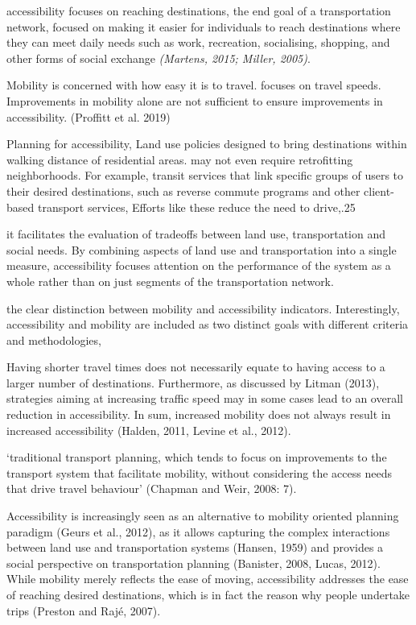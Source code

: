 \documentclass[12pt,]{article}
\begin{document}
accessibility focuses on reaching destinations, the end goal of a
transportation network, focused on making it easier for individuals to
reach destinations where they can meet daily needs such as work,
recreation, socialising, shopping, and other forms of social exchange
\emph{(Martens, 2015; Miller, 2005)}.

Mobility is concerned with how easy it is to travel. focuses on travel
speeds. Improvements in mobility alone are not sufficient to ensure
improvements in accessibility. (Proffitt et al. 2019)

Planning for accessibility, Land use policies designed to bring
destinations within walking distance of residential areas. may not even
require retrofitting neighborhoods. For example, transit services that
link specific groups of users to their desired destinations, such as
reverse commute programs and other client-based transport services,
Efforts like these reduce the need to drive,.25

it facilitates the evaluation of tradeoffs between land use,
transportation and social needs. By combining aspects of land use and
transportation into a single measure, accessibility focuses attention on
the performance of the system as a whole rather than on just segments of
the transportation network.

the clear distinction between mobility and accessibility indicators.
Interestingly, accessibility and mobility are included as two distinct
goals with different criteria and methodologies,

Having shorter travel times does not necessarily equate to having access
to a larger number of destinations. Furthermore, as discussed by Litman
(2013), strategies aiming at increasing traffic speed may in some cases
lead to an overall reduction in accessibility. In sum, increased
mobility does not always result in increased accessibility (Halden,
2011, Levine et al., 2012).

`traditional transport planning, which tends to focus on improvements to
the transport system that facilitate mobility, without considering the
access needs that drive travel behaviour' (Chapman and Weir, 2008: 7).

Accessibility is increasingly seen as an alternative to mobility
oriented planning paradigm (Geurs et al., 2012), as it allows capturing
the complex interactions between land use and transportation systems
(Hansen, 1959) and provides a social perspective on transportation
planning (Banister, 2008, Lucas, 2012). While mobility merely reflects
the ease of moving, accessibility addresses the ease of reaching desired
destinations, which is in fact the reason why people undertake trips
(Preston and Rajé, 2007).
\end{document}
